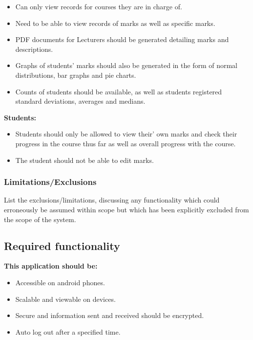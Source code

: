 \documentclass[11pt,a4paper]{article}
\begin{document}
\begin{itemize}
\item Can only view records for courses they are in charge of.
\item Need to be able to view records of marks as well as specific marks.
\item PDF documents for Lecturers should be generated detailing marks and 
descriptions.
\item Graphs of students’ marks should also be generated in the form of normal 
distributions, bar graphs and pie charts.
\item Counts of students should be available, as well as students registered standard 
deviations, averages and medians.
\end{itemize}
\textbf{Students:}
\begin{itemize}
\item Students should only be allowed to view their’ own marks and check their progress in the course thus far as well as overall progress with the course.
\item The student should not be able to edit marks.
\end{itemize}




\subsubsection{Limitations/Exclusions}


List the exclusions/limitations, discussing any functionality which could erroneously be assumed within scope but which has been explicitly excluded from the scope of the system.
\subsection{Required functionality}
\textbf{This application should be:}

\begin{itemize}
\item Accessible on android phones.
\item Scalable and viewable on devices.
\item Secure and information sent and received should be encrypted.
\item Auto log out after a specified time.
\end{itemize}
\end{document}
